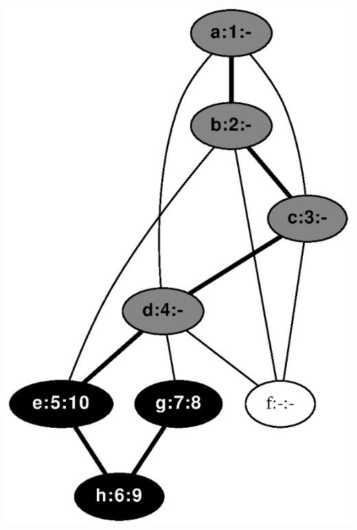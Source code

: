 \documentclass{article}
\begin{document}
\includegraphics[height=.3\textheight]{dfs_undirected_classroom_10.eps}
\vspace{1em}
\end{document}
